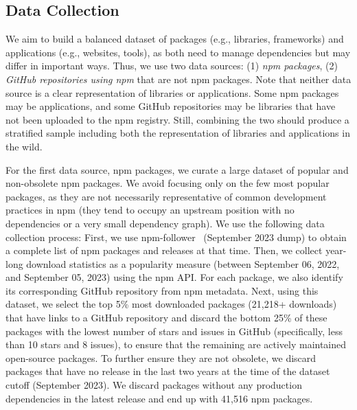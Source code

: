 \subsection{Data Collection}
\label{sec:data-collection}

We aim to build a balanced dataset of packages (e.g., libraries, frameworks) and applications (e.g., websites, tools), as both need to manage dependencies but may differ in important ways.
Thus, we use two data sources: (1) \emph{npm packages}, (2) \emph{GitHub repositories using npm} that are not npm packages.
Note that neither data source is a clear representation of libraries or applications. 
Some npm packages may be applications, and some GitHub repositories may be libraries that have not been uploaded to the npm registry. 
Still, combining the two should produce a stratified sample including both the representation of libraries and applications in the wild.


For the first data source, npm packages, we curate a large dataset of popular and non-obsolete npm packages. We avoid focusing only on the few most popular packages, as they are not necessarily representative of common development practices in npm (they tend to occupy an upstream position with no dependencies or a very small dependency graph). 
We use the following data collection process:
First, we use npm-follower~\cite{DBLP:conf/sigsoft/PinckneyCG023} (September 2023 dump) to obtain a complete list of npm packages and releases at that time.
Then, we collect year-long download statistics as a popularity measure (between September 06, 2022, and September 05, 2023) using the npm API. For each package, we also identify its corresponding GitHub repository from npm metadata.
Next, using this dataset, we select the top 5\% most downloaded packages (21,218+ downloads) that have links to a GitHub repository and discard the bottom 25\% of these packages with the lowest number of stars and issues in GitHub (specifically, less than 10 stars and 8 issues), to ensure that the remaining are actively maintained open-source packages.
To further ensure they are not obsolete, we discard packages that have no release in the last two years at the time of the dataset cutoff (September 2023).
We discard packages without any production dependencies in the latest release and end up with 41,516 npm packages.

